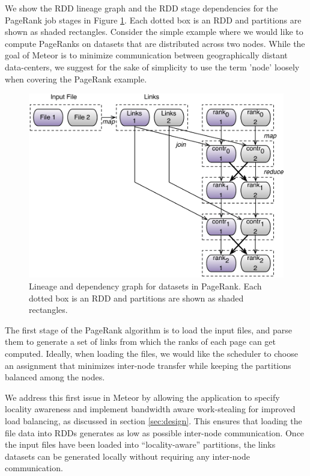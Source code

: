We show the RDD lineage graph and the RDD stage dependencies for the PageRank job stages in Figure \ref{fig:lineage}. Each dotted box is an RDD and partitions are shown as shaded rectangles. Consider the simple example where we would like to compute PageRanks on datasets that are distributed across two nodes. While the goal of Meteor is to minimize communication between geographically distant data-centers, we suggest for the sake of simplicity to use the term 'node' loosely when covering the PageRank example.

\begin{figure}[!ht]
    \centering
    \includegraphics[width=\textwidth]{figs/lineage.pdf}
    \caption{Lineage and dependency graph for datasets in PageRank. Each dotted box is an RDD and partitions are shown as shaded rectangles.}
    \label{fig:lineage}
\end{figure}

The first stage of the PageRank algorithm is to load the input files, and parse them to generate a set of links from which the ranks of each page can get computed. Ideally, when loading the files, we would like the scheduler to choose an assignment that minimizes inter-node transfer while keeping the partitions balanced among the nodes. 

We address this first issue in Meteor by allowing the application to specify locality awareness and implement bandwidth aware work-stealing for improved load balancing, as discussed in section \ref{sec:design}. This ensures that loading the file data into RDDs generates as low as possible inter-node communication. Once the input files have been loaded into ``locality-aware'' partitions, the links datasets can be generated locally without requiring any inter-node communication. 

